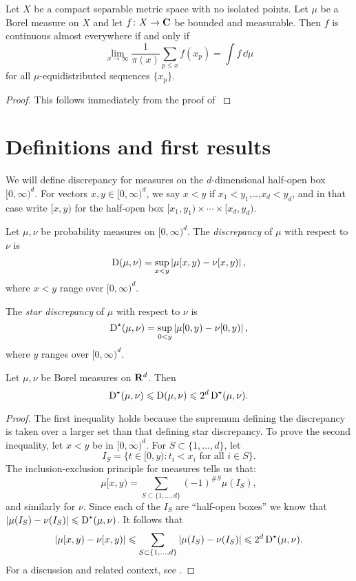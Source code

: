 \begin{theorem}
Let $X$ be a compact separable metric space with no isolated points. Let $\mu$ 
be a Borel measure on $X$ and let $f\colon X\to \mathbf{C}$ be bounded and measurable. 
Then $f$ is continuous almost everywhere if and only if 
\[
	\lim_{x\to \infty} \frac{1}{\pi(x)} \sum_{p\leqslant x} f(x_p) = \int f\, \dd\mu
\]
for all $\mu$-equidistributed sequences $\{x_p\}$. 
\end{theorem}
\begin{proof}
This follows immediately from the proof of \cite[Th.~1]{mazzone-1995}
\end{proof}





\section{Definitions and first results}

We will define discrepancy for measures on the $d$-dimensional half-open box 
$[0,\infty)^d$. For vectors $x,y\in [0,\infty)^d$, we say $x<y$ if 
$x_1<y_1$,\dots,$x_d<y_d$, and in that case write $[x,y)$ for the half-open 
box $[x_1,y_1)\times \cdots \times [x_d,y_d)$. 

\begin{definition}
Let $\mu, \nu$ be probability measures on $[0,\infty)^d$. The 
\emph{discrepancy} of $\mu$ with respect to $\nu$ is 
\[
	\operatorname{D}(\mu,\nu) = \sup_{x < y} \left| \mu[x,y) - \nu[x,y)\right| ,
\]
where $x<y$ range over $[0,\infty)^d$.

The \emph{star discrepancy} of $\mu$ with respect to $\nu$ is 
\[
	\operatorname{D}^\star(\mu,\nu) = \sup_{0<y} \left| \mu[0,y) - \nu[0,y)\right| ,
\]
where $y$ ranges over $[0,\infty)^d$. 
\end{definition}

\begin{lemma}
Let $\mu,\nu$ be Borel measures on $\mathbf{R}^d$. Then 
\[
	\operatorname{D}^\star(\mu,\nu) \leqslant \operatorname{D}(\mu,\nu) \leqslant 2^d \operatorname{D}^\star(\mu,\nu) .
\]
\end{lemma}
\begin{proof}
The first inequality holds because the supremum defining the discrepancy is 
taken over a larger set than that defining star discrepancy. To prove the 
second inequality, let $x<y$ be in $[0,\infty)^d$. For 
$S\subset \{1,\dots,d\}$, let 
\[
	I_S = \{ t \in [0,y) : t_i < x_i \text{ for all }i\in S\} .
\]
The inclusion-exclusion principle for measures tells us that: 
\[
	\mu[x,y) = \sum_{S\subset \{1,\dots,d\}} (-1)^{\# S} \mu(I_S) ,
\]
and similarly for $\nu$. Since each of the $I_S$ are ``half-open boxes'' 
we know that $|\mu(I_S) - \nu(I_S)| \leqslant \operatorname{D}^\star(\mu,\nu)$. It 
follows that 
\[
	|\mu[x,y) - \nu[x,y)| \leqslant \sum_{S\subset \{1,\dots,d\}} |\mu(I_S) - \nu(I_S)| \leqslant 2^d \operatorname{D}^\star(\mu,\nu) .
\]
For a discussion and related context, see 
\cite[Ch.~2 Ex.~1.2]{kuipers-niederreiter-1974}. 
\end{proof}

